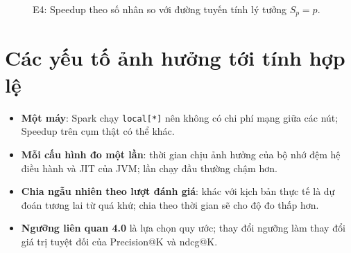 \begin{figure}[H]
\centering
{}
\vspace{5mm}
\caption[E4: Speedup theo số nhân]{E4: Speedup theo số nhân so với đường tuyến tính lý tưởng $S_p = p$.}
\label{fig:e4_speedup}
\end{figure}

\section{Các yếu tố ảnh hưởng tới tính hợp lệ}
\label{sec:hop_le}
\begin{itemize}
    \item \textbf{Một máy}: Spark chạy \texttt{local[*]} nên không có chi phí mạng giữa các nút; Speedup trên cụm thật có thể khác.
    \item \textbf{Mỗi cấu hình đo một lần}: thời gian chịu ảnh hưởng của bộ nhớ đệm hệ điều hành và JIT của JVM; lần chạy đầu thường chậm hơn. 
    \item \textbf{Chia ngẫu nhiên theo lượt đánh giá}: khác với kịch bản thực tế là dự đoán tương lai từ quá khứ; chia theo thời gian sẽ cho độ đo thấp hơn.
    \item \textbf{Ngưỡng liên quan \num{4,0}} là lựa chọn quy ước; thay đổi ngưỡng làm thay đổi giá trị tuyệt đối của Precision@K và \gls{ndcg}@K.
\end{itemize}
